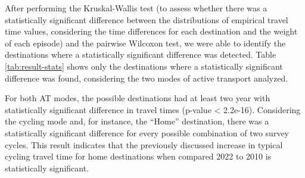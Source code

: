 \documentclass[preprint, 3p,
authoryear]{elsarticle} %
\begin{document}
After performing the Kruskal-Wallis test (to assess whether there was a
statistically significant difference between the distributions of
empirical travel time values, considering the time differences for each
destination and the weight of each episode) and the pairwise Wilcoxon
test, we were able to identify the destinations where a statistically
significant difference was detected. Table \ref{tab:result-stats} shows
only the destinations where a statistically significant difference was
found, considering the two modes of active transport analyzed.

For both AT modes, the possible destinations had at least two year with
statistically significant difference in travel times (p-value
\textless{} 2.2e-16). Considering the cycling mode and, for instance,
the ``Home'' destination, there was a statistically significant
difference for every possible combination of two survey cycles. This
result indicates that the previously discussed increase in typical
cycling travel time for home destinations when compared 2022 to 2010 is
statistically significant.
\end{document}
